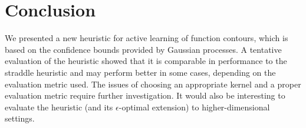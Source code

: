 \documentclass[11pt]{article} %
\begin{document}
\section{Conclusion}
We presented a new heuristic for active learning of function contours, which is
based on the confidence bounds provided by Gaussian processes. A tentative
evaluation of the heuristic showed that it is comparable in performance to the
straddle heuristic and may perform better in some cases, depending on the
evaluation metric used. The issues of choosing an appropriate kernel and
a proper evaluation metric require further investigation. It would also be
interesting to evaluate the heuristic
(and its $\epsilon$-optimal extension) to higher-dimensional settings.



\end{document}
